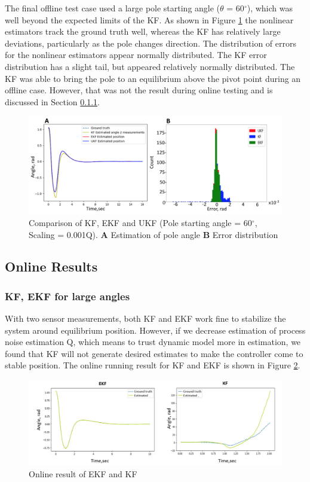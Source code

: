 \documentclass{article}
\begin{document}
 The final offline test case used a large pole starting angle ($\theta$ = 60$^{\circ}$), which was well beyond the expected limits of the KF.  As shown in Figure \ref{fig:offline60deg} the nonlinear estimators track the ground truth well, whereas the KF has relatively large deviations, particularly as the pole changes direction.  The distribution of errors for the nonlinear estimators appear normally distributed.  The KF error distribution has a slight tail, but appeared relatively normally distributed.  The KF was able to bring the pole to an equilibrium above the pivot point during an offline case.  However, that was not the result during online testing and is discussed in Section \ref{ssec:LargeAngleOnline}.
  \begin{figure}[h!]
 	\centering
 	\includegraphics[width=15cm,keepaspectratio]{offline60deg.png}
 	\caption{Comparison of KF, EKF and UKF (Pole starting angle = 60$^{\circ}$, Scaling = 0.001Q). \textbf{A} Estimation of pole angle \textbf{B} Error distribution}
 	\label{fig:offline60deg}
 \end{figure}

\subsection{Online Results}
\subsubsection{KF, EKF for large angles} \label{ssec:LargeAngleOnline}
With two sensor measurements, both KF and EKF work fine to stabilize the system around equilibrium position. However, if we decrease estimation of process noise estimation Q, which means to trust dynamic model more in estimation, we found that KF will not generate desired estimates to make the controller come to stable position. The online running result for KF and EKF is shown in Figure \ref{fig:onlineKFvsEKF}. 
\begin{figure}[h!]
	\centering
	\includegraphics[width=15cm,keepaspectratio]{EKFvsKF_online.png}
	\caption{Online result of EKF and KF}
	\label{fig:onlineKFvsEKF}
\end{figure}
\end{document}
